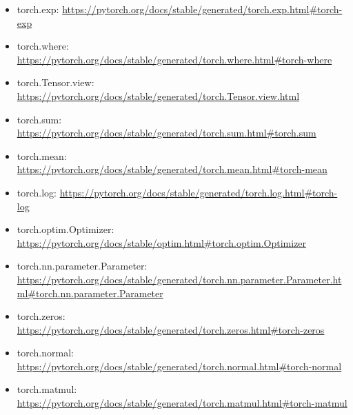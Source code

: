 \documentclass[11pt, a4paper]{article}
\begin{document}
\begin{itemize}
	\item torch.exp: \url{https://pytorch.org/docs/stable/generated/torch.exp.html#torch-exp}
	\item torch.where: \url{https://pytorch.org/docs/stable/generated/torch.where.html#torch-where}
	\item torch.Tensor.view: \url{https://pytorch.org/docs/stable/generated/torch.Tensor.view.html}
	\item torch.sum: \url{https://pytorch.org/docs/stable/generated/torch.sum.html#torch.sum}
	\item torch.mean: \url{https://pytorch.org/docs/stable/generated/torch.mean.html#torch-mean}
	\item torch.log: \url{https://pytorch.org/docs/stable/generated/torch.log.html#torch-log}
	\item torch.optim.Optimizer: \url{https://pytorch.org/docs/stable/optim.html#torch.optim.Optimizer}
	\item torch.nn.parameter.Parameter: \url{https://pytorch.org/docs/stable/generated/torch.nn.parameter.Parameter.html#torch.nn.parameter.Parameter}
	\item torch.zeros: \url{https://pytorch.org/docs/stable/generated/torch.zeros.html#torch-zeros}
	\item torch.normal: \url{https://pytorch.org/docs/stable/generated/torch.normal.html#torch-normal}
	\item torch.matmul: \url{https://pytorch.org/docs/stable/generated/torch.matmul.html#torch-matmul}
\end{itemize}
\end{document}
